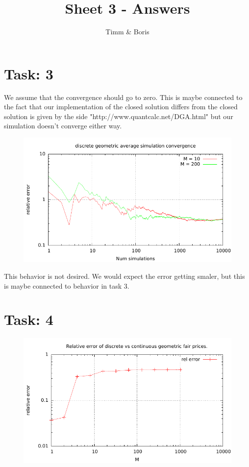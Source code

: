\documentclass{article}
\title{Sheet 3 - Answers}
\author{Timm \& Boris}
\begin{document}
\maketitle



\section*{Task: 3}

% 
We assume that the convergence should go to zero. This is maybe connected to the fact that our implementation of the closed solution differs from the closed solution is given by the side "http://www.quantcalc.net/DGA.html" but our simulation doesn't converge either way. 
\begin{figure}[htbp]
  \centering
     \includegraphics[width=1.0\textwidth]{../Task03/sh3_task3_convergence_plot.pdf}
\end{figure}
\newpage
This behavior is not desired. We would expect the error getting smaler, but this is maybe connected to behavior in task 3.
\section*{Task: 4}
\begin{figure}[htbp]
  \centering
     \includegraphics[width=1.0\textwidth]{../Task04/sh3_task4_convergence_plot.pdf}
\end{figure}
\end{document}
